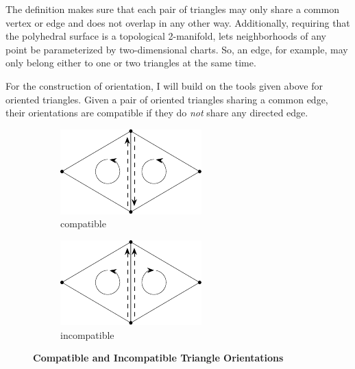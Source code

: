 \documentclass{stdlocal}
\begin{document}
  The definition makes sure that each pair of triangles may only share a common vertex or edge and does not overlap in any other way.
  Additionally, requiring that the polyhedral surface is a topological 2-manifold, lets neighborhoods of any point be parameterized by two-dimensional charts.
  So, an edge, for example, may only belong either to one or two triangles at the same time.

  For the construction of orientation, I will build on the tools given above for oriented triangles.
  Given a pair of oriented triangles sharing a common edge, their orientations are compatible if they do \textit{not} share any directed edge.

  \begin{figure}[h]
    \centering
    \begin{subfigure}[b]{0.49\linewidth}
      \centering
      \includegraphics[width=0.8\linewidth]{figures/compatible-triangle-orientations.pdf}
      \caption{compatible}
    \end{subfigure}
    \hfill
    \begin{subfigure}[b]{0.49\linewidth}
      \centering
      \includegraphics[width=0.8\linewidth]{figures/incompatible-triangle-orientations.pdf}
      \caption{incompatible}
    \end{subfigure}
    \caption[Compatible and Incompatible Triangle Orientations]{%
      \textbf{Compatible and Incompatible Triangle Orientations}\\
    }
    \label{fig:compatible-triangle-orientations}
  \end{figure}
\end{document}
